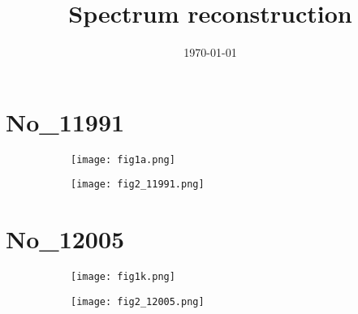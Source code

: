 \documentclass[%
 reprint,
 amsmath,amssymb,
 aps,
]{revtex4-2}
\begin{document}

\title{Spectrum reconstruction}

\date{\today}


\maketitle


\section{No_11991}

\begin{figure}[b]

\centering

\quad
    \begin{subfigure}[b]{0.45\textwidth}
    \centering
    \texttt{[image: fig1a.png]}
    \caption{\label{fig:fig1a.png}}
    \end{subfigure}
\quad
    \begin{subfigure}[b]{0.45\textwidth}
    \centering
    \texttt{[image: fig2\_11991.png]}
    \caption{\label{fig:fig2_11991.png}}
    \end{subfigure}


\captionsetup{justification=raggedright,singlelinecheck=false}
\caption{\label{fig:fig1a.png}}

\end{figure}



\section{No_12005}

\begin{figure}[b]

\centering

\quad
    \begin{subfigure}[b]{0.45\textwidth}
    \centering
    \texttt{[image: fig1k.png]}
    \caption{\label{fig:fig1k.png}}
    \end{subfigure}
\quad
    \begin{subfigure}[b]{0.45\textwidth}
    \centering
    \texttt{[image: fig2\_12005.png]}
    \caption{\label{fig:fig2_12005.png}}
    \end{subfigure}


\captionsetup{justification=raggedright,singlelinecheck=false}
\caption{\label{fig:fig1k.png}}

\end{figure}
\end{document}
